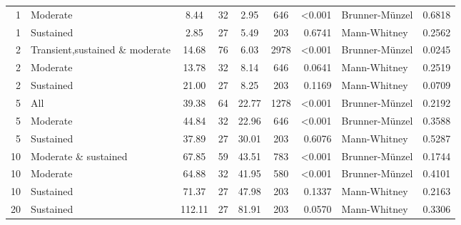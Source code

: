 \begin{table}[H]
\begin{tabular}{r p{4cm} c c c c r l r}
1 & Moderate &  8.44 & 32 & 2.95 & 646 & \textless 0.001 &  Brunner-Münzel & 0.6818 \\ 
1 & Sustained &  2.85 & 27 & 5.49 & 203 & 0.6741 &  Mann-Whitney & 0.2562 \\ 
2 & Transient,sustained \& moderate &  14.68 & 76 & 6.03 & 2978 & \textless 0.001 &  Brunner-Münzel & 0.0245 \\ 
2 & Moderate &  13.78 & 32 & 8.14 & 646 & 0.0641 &  Mann-Whitney & 0.2519 \\ 
2 & Sustained &  21.00 & 27 & 8.25 & 203 & 0.1169 &  Mann-Whitney & 0.0709 \\ 
5 & All &  39.38 & 64 & 22.77 & 1278 & \textless 0.001 &  Brunner-Münzel & 0.2192 \\ 
5 & Moderate &  44.84 & 32 & 22.96 & 646 & \textless 0.001 &  Brunner-Münzel & 0.3588 \\ 
5 & Sustained &  37.89 & 27 & 30.01 & 203 & 0.6076 &  Mann-Whitney & 0.5287 \\ 
10 & Moderate \& sustained &  67.85 & 59 & 43.51 & 783 & \textless 0.001 &  Brunner-Münzel & 0.1744 \\ 
10 & Moderate &  64.88 & 32 & 41.95 & 580 & \textless 0.001 &  Brunner-Münzel & 0.4101 \\ 
10 & Sustained &  71.37 & 27 & 47.98 & 203 & 0.1337 &  Mann-Whitney & 0.2163 \\ 
20 & Sustained &  112.11 & 27 & 81.91 & 203 & 0.0570 &  Mann-Whitney & 0.3306 \\ 
\bottomrule
\end{tabular}%
\label{tab:codebase_graph_latex_repository_graph_component_time_series_statistical_significance_test_classesnormal_previous} 
\end{table}
\newpage 
